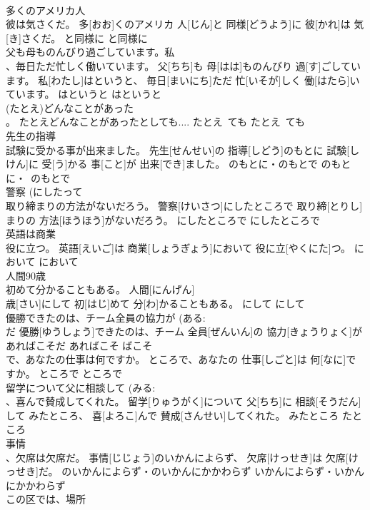 \documentclass[8pt]{extreport}
\begin{document}
\begin{CJK}{UTF8}{min}
\\	多くのアメリカ人 
\\	彼は気さくだ。	多[おお]くのアメリカ 人[じん]と 同様[どうよう]に 彼[かれ]は 気[き]さくだ。	と同様に	と同様に	
\\	父も母ものんびり過ごしています。私 
\\	、毎日ただ忙しく働いています。	父[ちち]も 母[はは]ものんびり 過[す]ごしています。 私[わたし]はというと、 毎日[まいにち]ただ 忙[いそが]しく 働[はたら]いています。	はというと	はというと	
\\	(たとえ)どんなことがあった 
\\	。	たとえどんなことがあったとしても....	たとえ~ても	たとえ~ても	
\\	先生の指導 
\\	試験に受かる事が出来ました。	先生[せんせい]の 指導[しどう]のもとに 試験[しけん]に 受[う]かる 事[こと]が 出来[でき]ました。	のもとに・のもとで	のもとに・~のもとで	
\\	警察 (にしたって 
\\	取り締まりの方法がないだろう。	警察[けいさつ]にしたところで 取り締[とりし]まりの 方法[ほうほう]がないだろう。	にしたところで	にしたところで	
\\	英語は商業 
\\	役に立つ。	英語[えいご]は 商業[しょうぎょう]において 役に立[やくにた]つ。	において	において	
\\	人間90歳 
\\	初めて分かることもある。	人間[にんげん] 
\\	歳[さい]にして 初[はじ]めて 分[わ]かることもある。	にして	にして	
\\	優勝できたのは、チーム全員の協力が (ある: 
\\	だ	優勝[ゆうしょう]できたのは、チーム 全員[ぜんいん]の 協力[きょうりょく]があればこそだ	あればこそ	ばこそ	
\\	で、あなたの仕事は何ですか。	ところで、あなたの 仕事[しごと]は 何[なに]ですか。	ところで	ところで	
\\	留学について父に相談して (みる: 
\\	、喜んで賛成してくれた。	留学[りゅうがく]について 父[ちち]に 相談[そうだん]して みたところ、 喜[よろこ]んで 賛成[さんせい]してくれた。	みたところ	たところ	
\\	事情 
\\	、欠席は欠席だ。	事情[じじょう]のいかんによらず、 欠席[けっせき]は 欠席[けっせき]だ。	のいかんによらず・のいかんにかかわらず	いかんによらず・いかんにかかわらず	
\\	この区では、場所 

\end{CJK}
\end{document}
